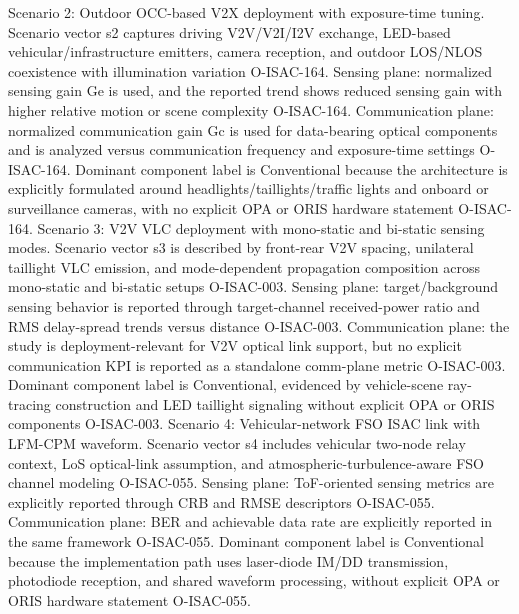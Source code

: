 {}Scenario 2: Outdoor OCC-based V2X deployment with exposure-time tuning.\markdownRendererHardLineBreak
{}Scenario vector s2 captures driving V2V/V2I/I2V exchange, LED-based vehicular/infrastructure emitters, camera reception, and outdoor LOS/NLOS coexistence with illumination variation O-ISAC-164. Sensing plane: normalized sensing gain Ge is used, and the reported trend shows reduced sensing gain with higher relative motion or scene complexity O-ISAC-164. Communication plane: normalized communication gain Gc is used for data-bearing optical components and is analyzed versus communication frequency and exposure-time settings O-ISAC-164. Dominant component label is Conventional because the architecture is explicitly formulated around headlights/taillights/traffic lights and onboard or surveillance cameras, with no explicit OPA or ORIS hardware statement O-ISAC-164.\markdownRendererParagraphSeparator
{}Scenario 3: V2V VLC deployment with mono-static and bi-static sensing modes.\markdownRendererHardLineBreak
{}Scenario vector s3 is described by front-rear V2V spacing, unilateral taillight VLC emission, and mode-dependent propagation composition across mono-static and bi-static setups O-ISAC-003. Sensing plane: target/background sensing behavior is reported through target-channel received-power ratio and RMS delay-spread trends versus distance O-ISAC-003. Communication plane: the study is deployment-relevant for V2V optical link support, but no explicit communication KPI is reported as a standalone comm-plane metric O-ISAC-003. Dominant component label is Conventional, evidenced by vehicle-scene ray-tracing construction and LED taillight signaling without explicit OPA or ORIS components O-ISAC-003.\markdownRendererParagraphSeparator
{}Scenario 4: Vehicular-network FSO ISAC link with LFM-CPM waveform.\markdownRendererHardLineBreak
{}Scenario vector s4 includes vehicular two-node relay context, LoS optical-link assumption, and atmospheric-turbulence-aware FSO channel modeling O-ISAC-055. Sensing plane: ToF-oriented sensing metrics are explicitly reported through CRB and RMSE descriptors O-ISAC-055. Communication plane: BER and achievable data rate are explicitly reported in the same framework O-ISAC-055. Dominant component label is Conventional because the implementation path uses laser-diode IM/DD transmission, photodiode reception, and shared waveform processing, without explicit OPA or ORIS hardware statement O-ISAC-055.\markdownRendererInterblockSeparator
{}
\markdownRendererSectionEnd \markdownRendererSectionBegin
{}\markdownRendererInterblockSeparator
